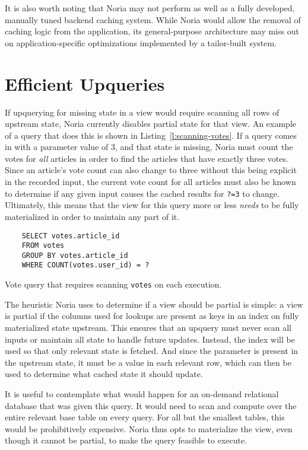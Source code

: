 It is also worth noting that Noria may not perform as well as a fully developed,
manually tuned backend caching system. While Noria would allow the removal of
caching logic from the application, its general-purpose architecture may miss
out on application-specific optimizations implemented by a tailor-built system.

\section{Efficient Upqueries}

If upquerying for missing state in a view would require scanning all rows of
upstream state, Noria currently disables partial state for that view. An example
of a query that does this is shown in Listing~\ref{l:scanning-votes}. If a query
comes in with a parameter value of 3, and that state is missing, Noria must
count the votes for \emph{all} articles in order to find the articles that have
exactly three votes. Since an article's vote count can also change to three
without this being explicit in the recorded input, the current vote count for
all articles must also be known to determine if any given input causes the
cached results for \texttt{?=3} to change. Ultimately, this means that the view
for this query more or less \emph{needs} to be fully materialized in order to
maintain any part of it.

\begin{listing}[h]
  \begin{verbatim}
    SELECT votes.article_id
    FROM votes
    GROUP BY votes.article_id
    WHERE COUNT(votes.user_id) = ?
  \end{verbatim}
  \caption{Vote query that requires scanning \texttt{votes} on each execution.}
  \label{l:scanning-votes}
\end{listing}

The heuristic Noria uses to determine if a view should be partial is simple: a
view is partial if the columns used for lookups are present as keys in an index
on fully materialized state upstream. This ensures that an upquery must never
scan all inputs or maintain all state to handle future updates. Instead, the
index will be used so that only relevant state is fetched. And since the
parameter is present in the upstream state, it must be a value in each relevant
row, which can then be used to determine what cached state it should update.

It is useful to contemplate what would happen for an on-demand relational
database that was given this query. It would need to scan and compute over the
entire relevant base table on every query. For all but the smallest tables, this
would be prohibitively expensive. Noria thus opts to materialize the view, even
though it cannot be partial, to make the query feasible to execute.

